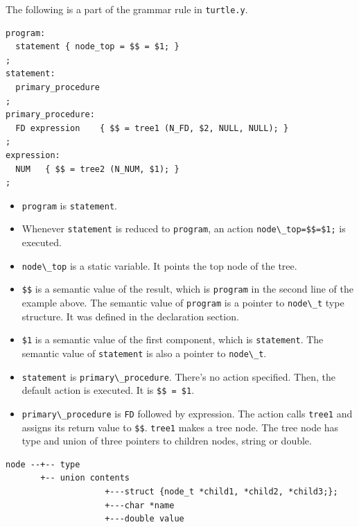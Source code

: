 The following is a part of the grammar rule in
\passthrough{\lstinline!turtle.y!}.

\begin{lstlisting}
program:
  statement { node_top = $$ = $1; }
;
statement:
  primary_procedure
;
primary_procedure:
  FD expression    { $$ = tree1 (N_FD, $2, NULL, NULL); }
;
expression:
  NUM   { $$ = tree2 (N_NUM, $1); }
;
\end{lstlisting}

\begin{itemize}
\tightlist
\item
  \passthrough{\lstinline!program!} is
  \passthrough{\lstinline!statement!}.
\item
  Whenever \passthrough{\lstinline!statement!} is reduced to
  \passthrough{\lstinline!program!}, an action
  \passthrough{\lstinline!node\_top=$$=$1;!} is executed.
\item
  \passthrough{\lstinline!node\_top!} is a static variable. It points
  the top node of the tree.
\item
  \passthrough{\lstinline!$$!} is a semantic value of the result, which
  is \passthrough{\lstinline!program!} in the second line of the example
  above. The semantic value of \passthrough{\lstinline!program!} is a
  pointer to \passthrough{\lstinline!node\_t!} type structure. It was
  defined in the declaration section.
\item
  \passthrough{\lstinline!$1!} is a semantic value of the first
  component, which is \passthrough{\lstinline!statement!}. The semantic
  value of \passthrough{\lstinline!statement!} is also a pointer to
  \passthrough{\lstinline!node\_t!}.
\item
  \passthrough{\lstinline!statement!} is
  \passthrough{\lstinline!primary\_procedure!}. There's no action
  specified. Then, the default action is executed. It is
  \passthrough{\lstinline!$$ = $1!}.
\item
  \passthrough{\lstinline!primary\_procedure!} is
  \passthrough{\lstinline!FD!} followed by expression. The action calls
  \passthrough{\lstinline!tree1!} and assigns its return value to
  \passthrough{\lstinline!$$!}. \passthrough{\lstinline!tree1!} makes a
  tree node. The tree node has type and union of three pointers to
  children nodes, string or double.
\end{itemize}

\begin{lstlisting}
node --+-- type
       +-- union contents
                    +---struct {node_t *child1, *child2, *child3;};
                    +---char *name
                    +---double value
\end{lstlisting}

